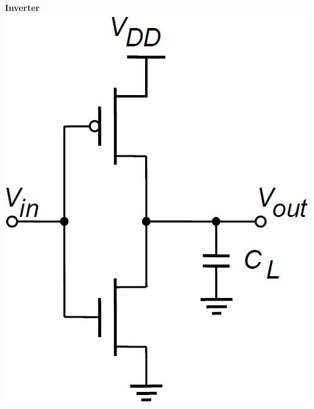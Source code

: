 \begin{minipage}[t]{0.32\columnwidth}
    \begin{center}
        \textbf{Inverter} \\
    \includegraphics[width=\columnwidth]{images/cmos_inverter.png}
    \end{center}
\end{minipage}
\hfill
